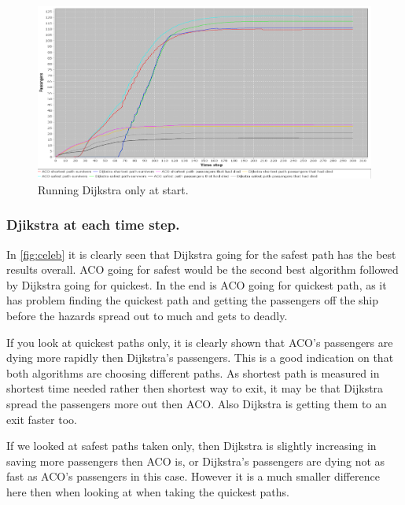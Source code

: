 \begin{figure} [float]
\centering
\hspace*{-1.0in}
\includegraphics[scale=0.35]{images/Graph-using-1000-rounds-140-passangers-and-one-fire-dijkstra-one-time.png}
\caption{Running Dijkstra only at start.}
\label{fig:celebDF}
\end{figure}

\subsubsection{Djikstra at each time step.}
In \ref{fig:celeb} it is clearly seen that Dijkstra going for the safest path has the best results overall. ACO going for safest would be the second best algorithm followed by Dijkstra going for quickest. In the end is ACO going for quickest path, as it has problem finding the quickest path and getting the passengers off the ship before the hazards spread out to much and gets to deadly.

If you look at quickest paths only, it is clearly shown that ACO's passengers are dying more rapidly then Dijkstra's passengers. This is a good indication on that both algorithms are choosing different paths. As shortest path is measured in shortest time needed rather then shortest way to exit, it may be that Dijkstra spread the passengers more out then ACO. Also Dijkstra is getting them to an exit faster too.

If we looked at safest paths taken only, then Dijkstra is slightly increasing in saving more passengers then ACO is, or Dijkstra's passengers are dying not as fast as ACO's passengers in this case. However it is a much smaller difference here then when looking at when taking the quickest paths.




